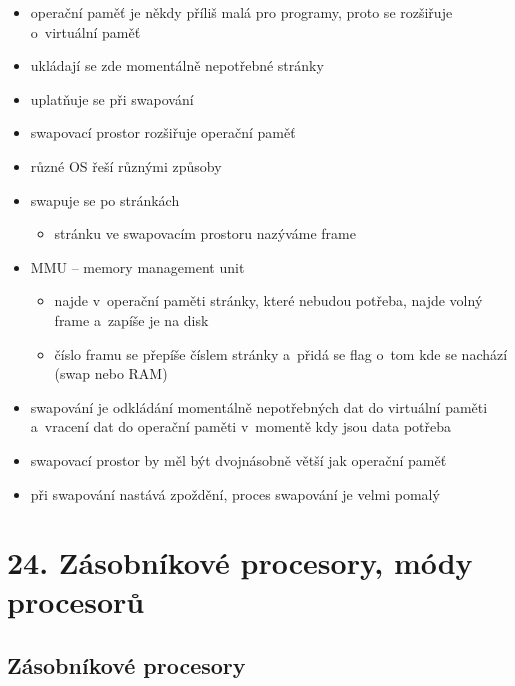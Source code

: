 \documentclass[a4paper,12pt]{article}
\providecommand{\tightlist}{%
\setlength{\itemsep}{0pt}\setlength{\parskip}{0pt}}
\begin{document}
\begin{itemize}
\tightlist
\item operační paměť je někdy příliš malá pro programy, proto se rozšiřuje
o~virtuální paměť
\item ukládají se zde momentálně nepotřebné stránky
\item uplatňuje se při swapování
\item swapovací prostor rozšiřuje operační paměť
\item různé OS řeší různými způsoby
\item swapuje se po stránkách

  \begin{itemize}
  \tightlist
  \item stránku ve swapovacím prostoru nazýváme frame
  \end{itemize}
\item MMU -- memory management unit

  \begin{itemize}
  \tightlist
  \item najde v~operační paměti stránky, které nebudou potřeba, najde volný
    frame a~zapíše je na disk
  \item číslo framu se přepíše číslem stránky a~přidá se flag o~tom kde se
    nachází (swap nebo RAM)
  \end{itemize}
\item swapování je odkládání momentálně nepotřebných dat do virtuální paměti
  a~vracení dat do operační paměti v~momentě kdy jsou data potřeba
\item swapovací prostor by měl být dvojnásobně větší jak operační paměť
\item při swapování nastává zpoždění, proces swapování je velmi pomalý
\end{itemize}

\section{24. Zásobníkové procesory, módy procesorů}

\subsection{Zásobníkové procesory}
\end{document}
